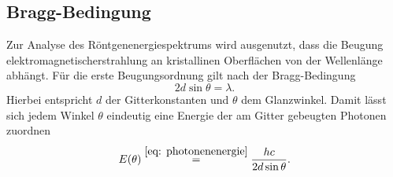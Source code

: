 \subsection{Bragg-Bedingung}
Zur Analyse des Röntgenenergiespektrums wird ausgenutzt, dass die Beugung elektromagnetischerstrahlung an kristallinen
Oberflächen von der Wellenlänge abhängt. Für die erste Beugungsordnung gilt nach der Bragg-Bedingung
\begin{equation}
  2 d \sin\theta = \lambda.
  \label{eq: bragg}
\end{equation}
Hierbei entspricht $d$ der Gitterkonstanten und $\theta$ dem Glanzwinkel. Damit lässt sich jedem Winkel $\theta$ eindeutig eine
Energie der am Gitter gebeugten Photonen zuordnen
\begin{equation}
  E(\theta) \overset{\eqref{eq: photonenenergie}}{=} \frac{h c}{2 d \sin \theta}.
  \label{eq: E_beugungswinkel}
\end{equation}
